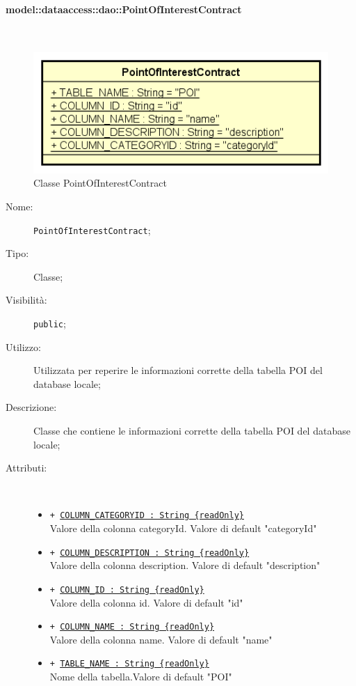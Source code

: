 \documentclass[../DefinizioneDiProdotto.tex]{subfiles}
\begin{document}
\paragraph{model::dataaccess::dao::PointOfInterestContract}
\
\begin{figure}[H]
	\centering
	\includegraphics[width=\maxwidth]{img/PointOfInterestContract.png}
	\caption{Classe PointOfInterestContract}\label{fig:model::dataaccess::dao::PointOfInterestContract} 
\end{figure}
\begin{description}
	\item[Nome:] \texttt{PointOfInterestContract};
	\item[Tipo:] Classe;
	\item[Visibilità:] \texttt{public};
	\item[Utilizzo:] Utilizzata per reperire le informazioni corrette della tabella POI del database locale;
	\item[Descrizione:] Classe che contiene le informazioni corrette della tabella POI del database locale;
	\item[Attributi:] \
	\begin{itemize}
		\item \texttt{+ \underline{COLUMN\_CATEGORYID : String \{readOnly\}}}\\
		Valore della colonna categoryId. Valore di default "categoryId"
		
		\item \texttt{+ \underline{COLUMN\_DESCRIPTION : String \{readOnly\}}}\\
		Valore della colonna description. Valore di default "description"
		
		\item \texttt{+ \underline{COLUMN\_ID : String \{readOnly\}}}\\
		Valore della colonna id. Valore di default "id"
		
		\item \texttt{+ \underline{COLUMN\_NAME : String \{readOnly\}}}\\
		Valore della colonna name. Valore di default "name"
		
		\item \texttt{+ \underline{TABLE\_NAME : String \{readOnly\}}}\\
		Nome della tabella.Valore di default "POI"
		
	\end{itemize}
\end{description}
\end{document}
